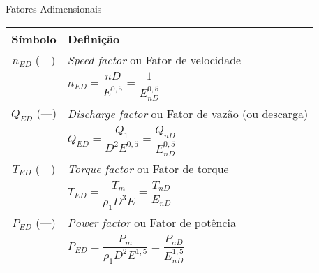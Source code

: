    \begin{frame}{Fatores Adimensionais}\vspace*{-1em}
        \setlength{\tabcolsep}{2mm}
        \noindent\begin{longtable}{cp{110mm}}
            \alert{Símbolo} & \alert{Definição} \\
            \hline
            $n_{ED}$ (---) &
            \textit{Speed factor\/} ou Fator de velocidade \\
            & \alert{$n_{ED} = \dfrac{nD}{E^{0,5}} = \dfrac{1}{E_{nD}^{0,5}}$} \\
            $Q_{ED}$ (---) &
            \textit{Discharge factor\/} ou Fator de vazão (ou descarga) \\
            & \alert{$Q_{ED} = \dfrac{Q_1}{D^2E^{0,5}} = \dfrac{Q_{nD}}{E_{nD}^{0,5}}$} \\
            $T_{ED}$ (---) &
            \textit{Torque factor\/} ou Fator de torque \\
            & \alert{$T_{ED} = \dfrac{T_m}{\rho_1D^3E} = \dfrac{T_{nD}}{E_{nD}}$} \\
            $P_{ED}$ (---) &
            \textit{Power factor\/} ou Fator de potência \\
            & \alert{$P_{ED} = \dfrac{P_m}{\rho_1D^2E^{1,5}} = \dfrac{P_{nD}}{E_{nD}^{1,5}}$} \\
            \hline
        \end{longtable}
    \end{frame}

